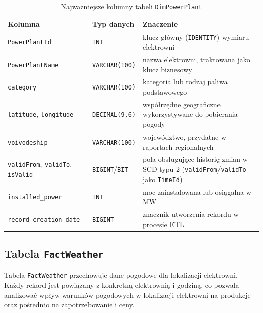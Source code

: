 \documentclass[12pt]{article}
\begin{document}
	\begin{table}[h!]
		\centering
		\small
		\begin{tabularx}{\textwidth}{|p{3.8cm}|p{2.4cm}|X|}
			\hline
			\textbf{Kolumna} & \textbf{Typ danych} & \textbf{Znaczenie} \\
			\hline
			\texttt{PowerPlantId} & \texttt{INT} & klucz główny (\texttt{IDENTITY}) wymiaru elektrowni \\
			\hline
			\texttt{PowerPlantName} & \texttt{VARCHAR(100)} & nazwa elektrowni, traktowana jako klucz biznesowy \\
			\hline
			\texttt{category} & \texttt{VARCHAR(100)} & kategoria lub rodzaj paliwa podstawowego \\
			\hline
			\texttt{latitude}, \texttt{longitude} & \texttt{DECIMAL(9,6)} & współrzędne geograficzne wykorzystywane do pobierania pogody \\
			\hline
			\texttt{voivodeship} & \texttt{VARCHAR(100)} & województwo, przydatne w raportach regionalnych \\
			\hline
			\texttt{validFrom}, \texttt{validTo}, \texttt{isValid} & \texttt{BIGINT}/\texttt{BIT} & pola obsługujące historię zmian w SCD typu 2 (\texttt{validFrom}/\texttt{validTo} jako \texttt{TimeId}) \\
			\hline
			\texttt{installed\_power} & \texttt{INT} & moc zainstalowana lub osiągalna w MW \\
			\hline
			\texttt{record\_creation\_date} & \texttt{BIGINT} & znacznik utworzenia rekordu w procesie ETL \\
			\hline
		\end{tabularx}
		\caption{Najważniejsze kolumny tabeli \texttt{DimPowerPlant}}
	\end{table}

	\subsection{Tabela \texttt{FactWeather}}

	Tabela \texttt{FactWeather} przechowuje dane pogodowe dla lokalizacji elektrowni. Każdy rekord jest powiązany z konkretną elektrownią i godziną, co pozwala analizować wpływ warunków pogodowych w lokalizacji elektrowni na produkcję oraz pośrednio na zapotrzebowanie i ceny.
\end{document}
